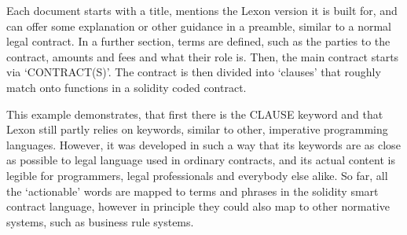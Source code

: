 \documentclass{article}
\newtheorem{example}{Example}
\begin{document}
Each document starts with a title, mentions the Lexon version it is built for, and can offer some explanation or other guidance in a preamble, similar to a normal legal contract. In a further section, terms are defined, such as the parties to the contract, amounts and fees and what their role is.
Then, the main contract starts via ‘CONTRACT(S)’. The contract is then divided into ‘clauses’ that roughly match onto functions in a solidity coded contract.
   

This example demonstrates, that first there is the CLAUSE keyword and that Lexon still partly relies on keywords, similar to other, imperative programming languages. However, it was developed in such a way that its keywords are as close as possible to legal language used in ordinary contracts, and its actual content is legible for programmers, legal professionals and everybody else alike.
So far, all the ‘actionable’ words are mapped to terms and phrases in the solidity smart contract language, however in principle they could also map to other normative systems, such as business rule systems.%
\end{document}
